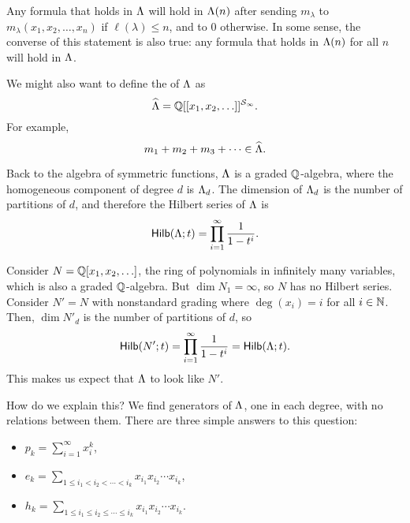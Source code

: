Any formula that holds in \(\operatorname{\Lambda}\) will hold in \(\operatorname{\Lambda}(n)\) after sending \(m_\lambda\) to \(m_\lambda(x_1, x_2, \ldots, x_n)\) if \(\ell(\lambda) \leq n\), and to \(0\) otherwise.
In some sense, the converse of this statement is also true: any formula that holds in \(\operatorname{\Lambda}(n)\) for all \(n\) will hold in \(\operatorname{\Lambda}\).

We might also want to define the  of \(\operatorname{\Lambda}\) as
\begin{equation*}
    \widehat{\operatorname{\Lambda}} = \mathbb{Q}[[x_1, x_2, \ldots]]^{\mathcal{S}_{\infty}}.
\end{equation*}
For example,
\begin{equation*}
    m_1 + m_2 + m_3 + \cdots \in \widehat{\operatorname{\Lambda}}.
\end{equation*}

Back to the algebra of symmetric functions,
\(\operatorname{\Lambda}\) is a graded \(\mathbb{Q}\)-algebra,
where the homogeneous component of degree \(d\) is \(\operatorname{\Lambda}_d\).
The dimension of \(\operatorname{\Lambda}_d\) is the number of partitions of \(d\),
and therefore the Hilbert series of \(\operatorname{\Lambda}\) is
\begin{equation*}
    \operatorname{\mathsf{Hilb}}(\operatorname{\Lambda}; t) = \prod_{i=1}^\infty \frac{1}{1-t^i}.
\end{equation*}

Consider \(N = \mathbb{Q}[x_1, x_2, \ldots]\), the ring of polynomials in infinitely many variables, which is also a graded \(\mathbb{Q}\)-algebra.
But \(\dim N_1 = \infty\), so \(N\) has no Hilbert series.
Consider \(N' = N\) with nonstandard grading where \(\deg(x_i) = i\) for all \(i \in \mathbb{N}\).
Then, \(\dim N'_d\) is the number of partitions of \(d\), so
\begin{equation*}
    \operatorname{\mathsf{Hilb}}(N'; t) = \prod_{i=1}^\infty \frac{1}{1-t^i} = \operatorname{\mathsf{Hilb}}(\operatorname{\Lambda}; t).
\end{equation*}
This makes us expect that \(\operatorname{\Lambda}\) to look like \(N'\).

How do we explain this? We find generators of \(\operatorname{\Lambda}\), one in each degree, with no relations between them.
There are three simple answers to this question:
\begin{itemize}
    \item {} \(p_k = \sum_{i=1}^\infty x_i^k\),
    \item {} \(e_k = \sum_{1 \leq i_1 < i_2 < \cdots < i_k} x_{i_1}x_{i_2}\cdots x_{i_k}\),
    \item {} \(h_k = \sum_{1 \leq i_1 \leq i_2 \leq \cdots \leq i_k} x_{i_1}x_{i_2}\cdots x_{i_k}\).
\end{itemize}

